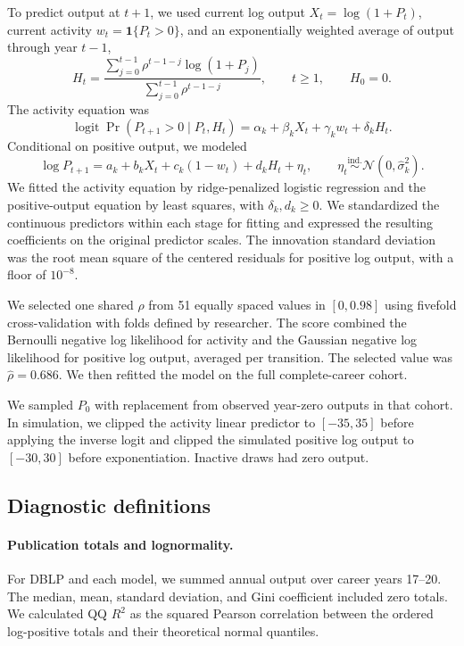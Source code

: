 \documentclass[9pt,twoside,lineno]{pnas-new}
\begin{document}
To predict output at $t+1$, we used current log output
$X_t=\log(1+P_t)$, current activity $w_t=\mathbf{1}\{P_t>0\}$,
and an exponentially weighted average of output through year $t-1$,
\begin{equation}
H_t=
\frac{\sum_{j=0}^{t-1}\rho^{t-1-j}\log(1+P_j)}
     {\sum_{j=0}^{t-1}\rho^{t-1-j}},
\qquad t\geq1,\qquad H_0=0.
\end{equation}
The activity equation was
\begin{equation}
\operatorname{logit}\Pr(P_{t+1}>0\mid P_t,H_t)
=\alpha_k+\beta_kX_t+\gamma_kw_t+\delta_kH_t.
\label{eq:se_hurdle_s_ext}
\end{equation}
Conditional on positive output, we modeled
\begin{equation}
\log P_{t+1}=a_k+b_kX_t+c_k(1-w_t)+d_kH_t+\eta_t,
\qquad
\eta_t\overset{\mathrm{ind.}}{\sim}\mathcal{N}(0,\hat\sigma_k^2).
\label{eq:se_hurdle_s_pos_int}
\end{equation}
We fitted the activity equation by ridge-penalized logistic regression
and the positive-output equation by least squares, with
$\delta_k,d_k\geq0$. We standardized the continuous predictors within
each stage for fitting and expressed the resulting coefficients on
the original predictor scales. The innovation standard deviation was
the root mean square of the centered residuals for positive log
output, with a floor of $10^{-8}$.

We selected one shared $\rho$ from 51 equally spaced values in
$[0,0.98]$ using fivefold cross-validation with folds defined by
researcher. The score combined the Bernoulli negative log likelihood
for activity and the Gaussian negative log likelihood for positive
log output, averaged per transition. The selected value was
$\hat\rho=0.686$. We then refitted the model on the full
complete-career cohort.

We sampled $P_0$ with replacement from observed year-zero outputs
in that cohort. In simulation, we clipped the activity linear
predictor to $[-35,35]$ before applying the inverse logit and clipped
the simulated positive log output to $[-30,30]$ before
exponentiation. Inactive draws had zero output.


\subsection*{Diagnostic definitions}

\paragraph{Publication totals and lognormality.}
For DBLP and each model, we summed annual output over career years
17--20. The median, mean, standard deviation, and Gini coefficient
included zero totals. We calculated QQ $R^2$ as the squared Pearson
correlation between the ordered log-positive totals and their
theoretical normal quantiles.
\end{document}
